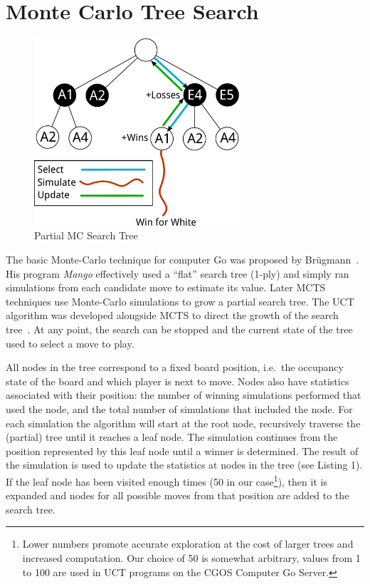 \documentclass{acm_proc_article-sp}
\begin{document}
\section{Monte Carlo Tree Search} \label{mcts}

\begin{figure}
	\begin{center}
	\includegraphics[width=3.0in]{graphics/tree.pdf}
	\end{center}
	\caption{Partial MC Search Tree}
	\label{fig:tree}
\end{figure}

The basic Monte-Carlo technique for computer Go was proposed by Br\"{u}gmann~\cite{brugmann1993monte}. His program \emph{Mango} effectively used a ``flat'' search tree (1-ply) and simply ran simulations from each candidate move to estimate its value. 
Later MCTS techniques use Monte-Carlo simulations to grow a partial search tree. 
The UCT algorithm was developed alongside MCTS to direct the growth of the search tree~\cite{gelly2006exploration}. 
At any point, the search can be stopped and the current state of the tree used to select a move to play. 

All nodes in the tree correspond to a fixed board position, i.e.~the occupancy state of the board and which player is next to move. 
Nodes also have statistics associated with their position:  the number of winning simulations performed that used the node, and the total number of simulations that included the node. 
For each simulation the algorithm will start at the root node, recursively traverse the (partial) tree until it reaches a leaf node.
The simulation continues from the position represented by this leaf node until a winner is determined.
The result of the simulation is used to update the statistics at nodes in the tree
(see Listing 1).
If the leaf node has been visited enough times (50 in our case\footnote{Lower numbers promote accurate exploration at the cost of larger trees and increased computation. Our choice of 50 is somewhat arbitrary, values from 1 to 100 are used in UCT programs on the CGOS Computer Go Server\cite{cgosbots}.}), then it is expanded and nodes for all possible moves from 
that position are added to the search tree.
\end{document}
